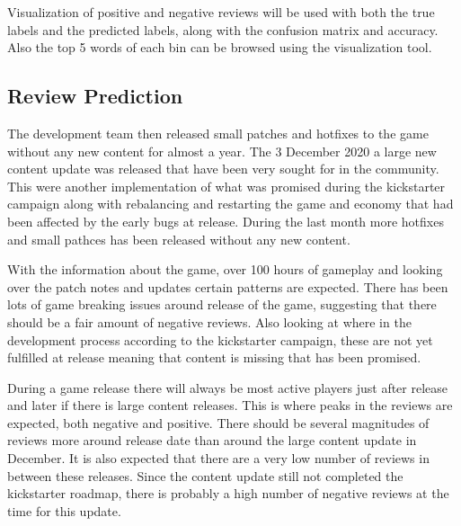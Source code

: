 Visualization of positive and negative reviews will be used with both the true labels and the predicted labels, along with the confusion matrix and accuracy.
Also the top 5 words of each bin can be browsed using the visualization tool.


\subsection{Review Prediction}
\label{sec:review-prediction}


The development team then released small patches and hotfixes to the game without any new content for almost a year. 
The 3 December 2020 a large new content update was released that have been very sought for in the community. 
This were another implementation of what was promised during the kickstarter campaign along with rebalancing and restarting the game and economy that had been affected by the early bugs at release. During the last month more hotfixes and small pathces has been released without any new content.


With the information about the game, over 100 hours of gameplay and looking over the patch notes and updates certain patterns are expected. 
There has been lots of game breaking issues around release of the game, suggesting that there should be a fair amount of negative reviews. 
Also looking at where in the development process according to the kickstarter campaign, these are not yet fulfilled at release meaning that content is missing that has been promised. 


During a game release there will always be most active players just after release and later if there is large content releases. 
This is where peaks in the reviews are expected, both negative and positive. 
There should be several magnitudes of reviews more around release date than around the large content update in December. 
It is also expected that there are a very low number of reviews in between these releases. 
Since the content update still not completed the kickstarter roadmap, there is probably a high number of negative reviews at the time for this update.